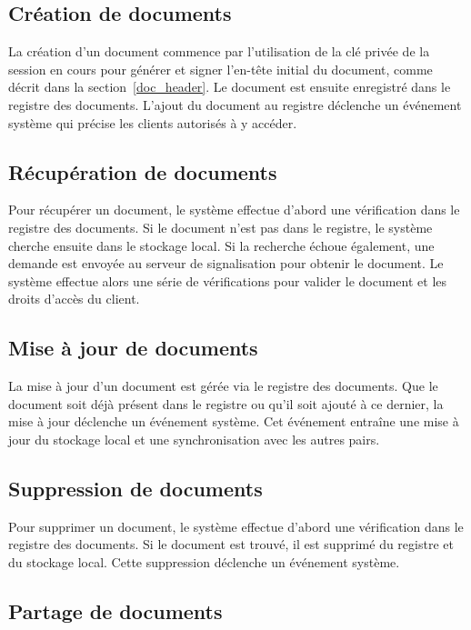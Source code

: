 \subsection{Création de documents}

La création d'un document commence par l'utilisation de la clé privée de la session en cours pour générer et signer l'en-tête initial du document, comme décrit dans la section~\ref{doc_header}. Le document est ensuite enregistré dans le registre des documents. L'ajout du document au registre déclenche un événement système qui précise les clients autorisés à y accéder.

\subsection{Récupération de documents}

Pour récupérer un document, le système effectue d'abord une vérification dans le registre des documents. Si le document n'est pas dans le registre, le système cherche ensuite dans le stockage local. Si la recherche échoue également, une demande est envoyée au serveur de signalisation pour obtenir le document. Le système effectue alors une série de vérifications pour valider le document et les droits d'accès du client.

\subsection{Mise à jour de documents}

La mise à jour d'un document est gérée via le registre des documents. Que le document soit déjà présent dans le registre ou qu'il soit ajouté à ce dernier, la mise à jour déclenche un événement système. Cet événement entraîne une mise à jour du stockage local et une synchronisation avec les autres pairs.

\subsection{Suppression de documents}

Pour supprimer un document, le système effectue d'abord une vérification dans le registre des documents. Si le document est trouvé, il est supprimé du registre et du stockage local. Cette suppression déclenche un événement système.

\subsection{Partage de documents}

